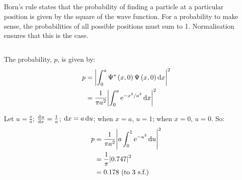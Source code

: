 \subsection{}
Born's rule states that the probability of finding a particle at a particular position is given by the square of the wave function. For a probability to make sense, the probabilities of all possible positions must sum to 1. Normalisation ensures that this is the case.

\subsection{}
The probability, $ p $, is given by:
\begin{align*}
    p & = \abs{\int_0^a \Psi^* \del{x, 0} \Psi \del{x, 0} \dif x}^2\\
    & = \frac{1}{\pi a^2} \abs{\int_0^a \operatorname{e}^{-x^2/a^2}  \dif x}^2
\end{align*}

Let $ u = \frac{x}{a} $; $ \od{u}{x} = \frac{1}{a} $; $ \dif x = a \dif u $; when $ x = a $, $ u = 1 $; when $ x = 0 $, $ u = 0 $. So:
\begin{align*}
    p & = \frac{1}{\pi a^2} \abs{a \int_0^1 \operatorname{e}^{-u^2} \dif u}^2\\
    & = \frac{1}{\pi} \abs{0.747}^2\\
    & = 0.178 \textrm{ (to 3 s.f.)}
\end{align*}
